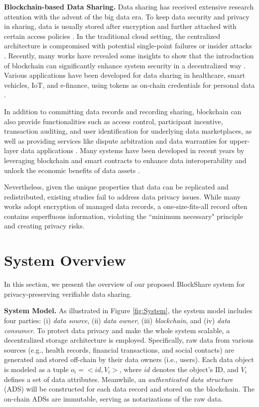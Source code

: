 \documentclass[11pt,divpdfm]{article}
\begin{document}
\textbf{Blockchain-based Data Sharing.}
Data sharing has received extensive research attention with the advent of the big data era.
To keep data security and privacy in sharing, data is usually stored after encryption and further attached with certain access policies \cite{liu2012mona, pasquier2015camflow}.
In the traditional cloud setting, the centralized architecture is compromised with potential single-point failures or insider attacks \cite{wang2022privacy}.
Recently, many works have revealed some insights to show that the introduction of blockchain can significantly enhance system security in a decentralized way \cite{zheng2018scalable, qi2020cpds}.
Various applications have been developed for data sharing in healthcare, smart vehicles, IoT, and e-finance, using tokens as on-chain credentials for personal data \cite{yu2021blockchain, xia2017medshare}.

In addition to committing data records and recording sharing, blockchain can also provide functionalities such as access control, participant incentive, transaction auditing, and user identification for underlying data marketplaces, as well as providing services like dispute arbitration and data warranties for upper-layer data applications \cite{lu2020blockchain, shen2020blockchain}.
Many systems have been developed in recent years by leveraging blockchain and smart contracts to enhance data interoperability and unlock the economic benefits of data assets \cite{liu2018bpds}.

Nevertheless, given the unique properties that data can be replicated and redistributed, existing studies fail to address data privacy issues.
While many works adopt encryption of managed data records, a one-size-fits-all record often contains superfluous information, violating the ``minimum necessary" principle and creating privacy risks.



\section{System Overview}
In this section, we present the overview of our proposed BlockShare system for privacy-preserving verifiable data sharing.

\textbf{System Model.}
As illustrated in Figure \ref{fig:System}, the system model includes four parties: (i) \emph{data source}, (ii) \emph{data owner}, (iii) \emph{blockchain}, and (iv) \emph{data consumer}.
To protect data privacy and make the whole system scalable, a decentralized storage architecture is employed.
Specifically, raw data from various sources (e.g., health records, financial transactions, and social contacts) are generated and stored off-chain by their data owners (i.e., users).
Each data object is modeled as a tuple $o_i = <id, V_i>$, where $id$ denotes the object's ID, and $V_i$ defines a set of data attributes.
Meanwhile, an \emph{authenticated data structure} (ADS) will be constructed for each data record and stored on the blockchain.
The on-chain ADSs are immutable, serving as notarizations of the raw data.
\end{document}
